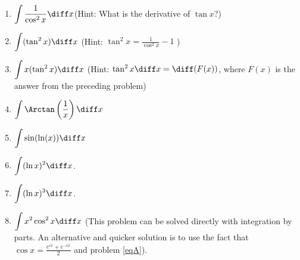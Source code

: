 \begin{multicols}{2}
\begin{enumerate}
\item $\displaystyle\int \frac{1}{\cos^2 x}\diff x$\quad \quad (Hint: What is the derivative of $\tan x$?)
\item $\displaystyle\int (\tan^2 x) \diff x $ \quad \quad (Hint: $\tan^2 x = \frac{1}{\cos^2x }-1$ )


\item $\displaystyle\int x(\tan^2 x) \diff x $ \quad \quad (Hint: $\tan^2 x \diff x= \diff (F(x))$, where $F(x)$ is the answer from the preceding problem)
\item 
$\displaystyle
\int\Arctan \left(\frac{1}x\right)\diff x
$
\item $\displaystyle\int \sin (\ln (x)) \diff x $
\item $\displaystyle\int (\ln x)^2 \diff x$.
\item $\displaystyle\int (\ln x)^3 \diff x$.
\item $\displaystyle\int x^2\cos^2x \diff x$ (This problem can be solved directly with integration by parts. An alternative and quicker solution is to use the fact that $\cos x= \frac{ e^{ix} + e^{-ix}}{2}$ and problem \ref{eqA}).
\end{enumerate}
\end{multicols}

